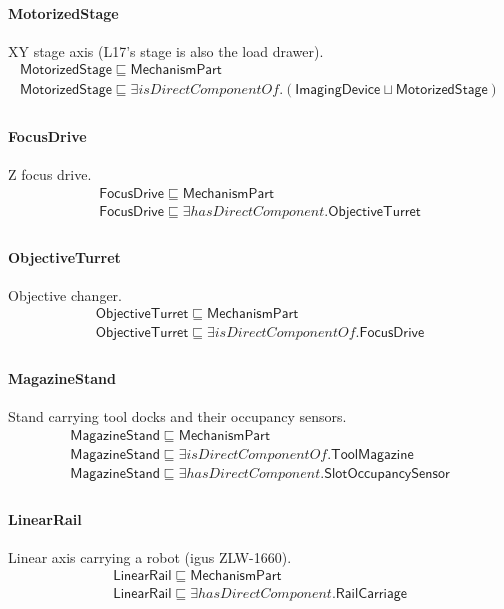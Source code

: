\documentclass[10pt]{article}
\begin{document}
\paragraph{MotorizedStage} XY stage axis (L17's stage is also the load drawer).
\[\begin{array}{l}
\mathsf{MotorizedStage} \sqsubseteq  \mathsf{MechanismPart} \\
\mathsf{MotorizedStage} \sqsubseteq  \exists \mathit{isDirectComponentOf}.(\mathsf{ImagingDevice} \sqcup  \mathsf{MotorizedStage}) \\
\end{array}\]
\paragraph{FocusDrive} Z focus drive.
\[\begin{array}{l}
\mathsf{FocusDrive} \sqsubseteq  \mathsf{MechanismPart} \\
\mathsf{FocusDrive} \sqsubseteq  \exists \mathit{hasDirectComponent}.\mathsf{ObjectiveTurret} \\
\end{array}\]
\paragraph{ObjectiveTurret} Objective changer.
\[\begin{array}{l}
\mathsf{ObjectiveTurret} \sqsubseteq  \mathsf{MechanismPart} \\
\mathsf{ObjectiveTurret} \sqsubseteq  \exists \mathit{isDirectComponentOf}.\mathsf{FocusDrive} \\
\end{array}\]
\paragraph{MagazineStand} Stand carrying tool docks and their occupancy sensors.
\[\begin{array}{l}
\mathsf{MagazineStand} \sqsubseteq  \mathsf{MechanismPart} \\
\mathsf{MagazineStand} \sqsubseteq  \exists \mathit{isDirectComponentOf}.\mathsf{ToolMagazine} \\
\mathsf{MagazineStand} \sqsubseteq  \exists \mathit{hasDirectComponent}.\mathsf{SlotOccupancySensor} \\
\end{array}\]
\paragraph{LinearRail} Linear axis carrying a robot (igus ZLW-1660).
\[\begin{array}{l}
\mathsf{LinearRail} \sqsubseteq  \mathsf{MechanismPart} \\
\mathsf{LinearRail} \sqsubseteq  \exists \mathit{hasDirectComponent}.\mathsf{RailCarriage} \\
\end{array}\]
\end{document}
